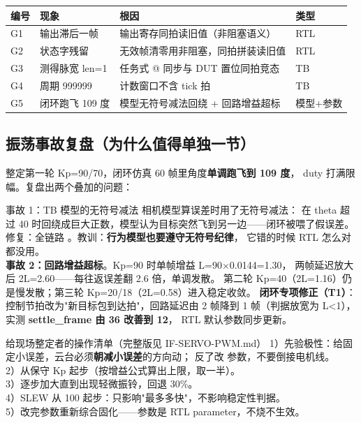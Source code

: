 \begin{center}
\begin{tabular}{llp{5.4cm}l}
\toprule
\rowcolor{rowtint}\textbf{编号} & \textbf{现象} & \textbf{根因} & \textbf{类型} \\
\midrule
G1 & 输出滞后一帧 & 输出寄存同拍读旧值（非阻塞语义） & RTL \\
G2 & 状态字残留 & 无效帧清零用非阻塞，同拍拼装读旧值 & RTL \\
G3 & 测得脉宽 len=1 & 任务式 @ 同步与 DUT 置位同拍竞态 & TB \\
G4 & 周期 999999 & 计数窗口不含 tick 拍 & TB \\
G5 & 闭环跑飞 109 度 & 模型无符号减法回绕 + 回路增益超标 & 模型+参数 \\
\bottomrule
\end{tabular}
\end{center}

\subsection{振荡事故复盘（为什么值得单独一节）}

整定第一轮 Kp=90/70，闭环仿真 60 帧里角度\textbf{单调跑飞到 109 度}，
duty 打满限幅。复盘出两个叠加的问题：

\begin{warnbox}{事故 1：TB 模型的无符号减法}
相机模型算误差时用了无符号减法： 在 theta 超过 40
时回绕成巨大正数，模型认为目标突然飞到另一边——闭环被喂了假误差。
修复：全链路 。教训：\textbf{行为模型也要遵守无符号纪律}，
它错的时候 RTL 怎么对都没用。\\[4pt]
\textbf{事故 2：回路增益超标}。Kp=90 时单帧增益 L=90×0.0144=1.30，
两帧延迟放大后 2L=2.60——每往返误差翻 2.6 倍，单调发散。
第二轮 Kp=40（2L=1.16）仍是慢发散；第三轮 Kp=20/18（2L=0.58）进入稳定收敛。
\textbf{闭环专项修正（T1）}：控制节拍改为"新目标包到达拍"，回路延迟由 2 帧降到
1 帧（判据放宽为 L<1），实测 \textbf{settle\_frame 由 36 改善到 12}，
RTL 默认参数同步更新。
\end{warnbox}

\begin{keybox}{给现场整定者的操作清单（完整版见 IF-SERVO-PWM.md）}
1）先验极性：给固定小误差，云台必须\textbf{朝减小误差}的方向动；
反了改  参数，不要倒接电机线。\\
2）从保守 Kp 起步（按增益公式算出上限，取一半）。\\
3）逐步加大直到出现轻微振铃，回退 30\%。\\
4）SLEW 从 100 起步：只影响"最多多快"，不影响稳定性判据。\\
5）改完参数重新综合固化——参数是 RTL parameter，不烧不生效。
\end{keybox}

